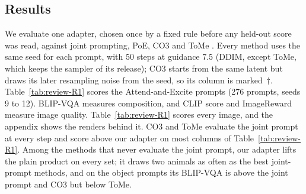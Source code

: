 \documentclass{article} %
\begin{document}

\subsection{Results}
\label{sec:results}
We evaluate one adapter, chosen once by a fixed rule before any held-out score was read, against joint prompting, PoE, CO3 and ToMe \cite{hu2024tome}. Every method uses the same seed for each prompt, with 50 steps at guidance 7.5 (DDIM, except ToMe, which keeps the sampler of its release); CO3 starts from the same latent but draws its later resampling noise from the seed, so its column is marked~$\dagger$. Table~\ref{tab:review-R1} scores the Attend-and-Excite \citep{chefer2023attend} prompts (276 prompts, seeds 9 to 12). BLIP-VQA \citep{li2022blip} measures composition, and CLIP score and ImageReward \citep{xu2023imagereward} measure image quality. Table~\ref{tab:review-R1} scores every image, and the appendix shows the renders behind it. CO3 and ToMe evaluate the joint prompt at every step and score above our adapter on most columns of Table~\ref{tab:review-R1}. Among the methods that never evaluate the joint prompt, our adapter lifts the plain product on every set; it draws two animals as often as the best joint-prompt methods, and on the object prompts its BLIP-VQA is above the joint prompt and CO3 but below ToMe.
\end{document}

